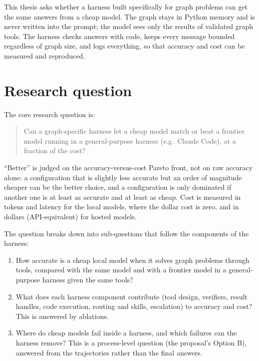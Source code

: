This thesis asks whether a harness built specifically for graph problems can get the same answers from a cheap
model. The graph stays in Python memory and is never written into the prompt; the model sees only the results of
validated graph tools. The harness checks answers with code, keeps every message bounded regardless of graph size,
and logs everything, so that accuracy and cost can be measured and reproduced.

\section{Research question}

The core research question is:

\begin{quote}
Can a graph-specific harness let a cheap model match or beat a frontier model running in a general-purpose harness
(e.g.\ Claude Code), at a fraction of the cost?
\end{quote}

``Better'' is judged on the accuracy-versus-cost Pareto front, not on raw accuracy alone: a configuration that is
slightly less accurate but an order of magnitude cheaper can be the better choice, and a configuration is only
dominated if another one is at least as accurate and at least as cheap. Cost is measured in tokens and latency for the
local models, where the dollar cost is zero, and in dollars (API-equivalent) for hosted models.

The question breaks down into sub-questions that follow the components of the harness:
\begin{enumerate}
  \item How accurate is a cheap local model when it solves graph problems through tools, compared with the same model
        and with a frontier model in a general-purpose harness given the same tools?
  \item What does each harness component contribute (tool design, verifiers, result handles, code execution,
        routing and skills, escalation) to accuracy and cost? This is answered by ablations.
  \item Where do cheap models fail inside a harness, and which failures can the harness remove? This is a
        process-level question (the proposal's Option B), answered from the trajectories rather than the final answers.
\end{enumerate}

